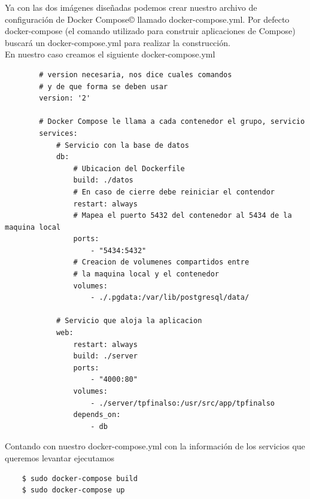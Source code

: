 \documentclass[14pt]{extarticle}
\begin{document}
    Ya con las dos imágenes diseñadas podemos crear nuestro archivo de configuración de Docker Compose\copyright{} llamado docker-compose.yml. Por defecto docker-compose (el comando utilizado para construir aplicaciones de Compose) buscará un docker-compose.yml para realizar la construcción.\\
    En nuestro caso creamos el siguiente docker-compose.yml
    \\
    \begin{lstlisting}
        # version necesaria, nos dice cuales comandos 
        # y de que forma se deben usar
        version: '2'

        # Docker Compose le llama a cada contenedor el grupo, servicio
        services:
            # Servicio con la base de datos
            db:
                # Ubicacion del Dockerfile
                build: ./datos
                # En caso de cierre debe reiniciar el contendor
                restart: always
                # Mapea el puerto 5432 del contenedor al 5434 de la maquina local
                ports:
                    - "5434:5432"
                # Creacion de volumenes compartidos entre
                # la maquina local y el contenedor
                volumes:
                    - ./.pgdata:/var/lib/postgresql/data/

            # Servicio que aloja la aplicacion
            web:
                restart: always
                build: ./server
                ports:
                    - "4000:80"
                volumes:
                    - ./server/tpfinalso:/usr/src/app/tpfinalso
                depends_on:
                    - db
    \end{lstlisting}
    Contando con nuestro docker-compose.yml con la información de los servicios que queremos levantar ejecutamos

    \begin{lstlisting}
    $ sudo docker-compose build
    $ sudo docker-compose up
    \end{lstlisting}
\end{document}
